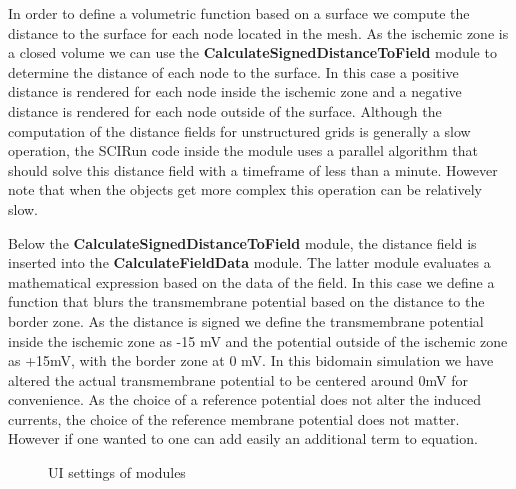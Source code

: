 \documentclass[fleqn,11pt,openany]{book}
\begin{document}
In order to define a volumetric function based on a surface we compute the distance to the surface for each node located in the mesh. As the ischemic zone is a closed volume we can use the {\bf CalculateSignedDistanceToField} module to determine the distance of each node to the surface. In this case a positive distance is rendered for each node inside the ischemic zone and a negative distance is rendered for each node outside of the surface. Although the computation of the distance fields for unstructured grids is generally a slow operation, the SCIRun code inside the module uses a parallel algorithm that should solve this distance field with a timeframe of less than a minute. However note that when the objects get more complex this operation can be relatively slow.

Below the  {\bf CalculateSignedDistanceToField} module, the distance field is inserted into the {\bf CalculateFieldData} module. The latter module evaluates a mathematical expression based on the data of the field. In this case we define a function that blurs the transmembrane potential based on the distance to the border zone. As the distance is signed we define the transmembrane potential inside the ischemic zone as -15 mV and the potential outside of the ischemic zone as +15mV, with the border zone at 0 mV. In this bidomain simulation we have altered the actual transmembrane potential to be centered around 0mV for convenience. As the choice of a reference potential does not alter the induced currents, the choice of the reference membrane potential does not matter. However if one wanted to one can add easily an additional term to equation.

\begin{figure}
\caption{UI settings of modules}\label{fig:BuildSimulationModel2}
\end{figure}
\end{document}
